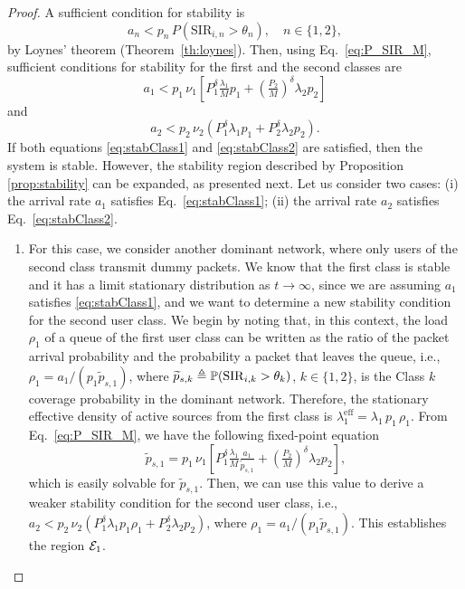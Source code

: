 \begin{proof}
	A sufficient condition for stability is
    \begin{equation}
    a_n < p_n \, P(\mathrm{SIR}_{i,n} > \theta_n), \quad n\in\{1,2\},
    \end{equation}
by Loynes' theorem (Theorem~\ref{th:loynes}). Then, using Eq.~\eqref{eq:P_SIR_M}, sufficient conditions for stability for the first and the second classes are  
    \begin{equation} \label{eq:stabClass1}
    	a_1<p_1\,\nu_1\!\left[P_1^\delta\tfrac{\lambda_1}{M}p_1+\left(\tfrac{P_2}{M}\right)^\delta\lambda_2p_2\right]
    \end{equation}
    and 
    \begin{equation} \label{eq:stabClass2}
	a_2 < p_2\,\nu_2\!\left(P_1^\delta\lambda_1p_1
    	+ P_2^\delta\lambda_2p_2\right).
    \end{equation}
    If both equations \eqref{eq:stabClass1} and \eqref{eq:stabClass2} are satisfied, then the system is stable. However, the stability region described by Proposition \ref{prop:stability} can be expanded, as presented next. Let us consider two cases: (i) the arrival rate $a_1$ satisfies Eq.~\eqref{eq:stabClass1}; (ii) the arrival rate $a_2$ satisfies Eq.~\eqref{eq:stabClass2}.
\begin{enumerate}[label=(\roman*)]
    \item For this case, we consider another dominant network, where only users of the second class transmit dummy packets. We know that the first class is stable and it has a limit stationary distribution as $t\to\infty$, since we are assuming $a_1$ satisfies \eqref{eq:stabClass1}, and we want to determine a new stability condition for the second user class. We begin by noting that, in this context, the load $\rho_1$ of a queue of the first user class can be written as the ratio of the packet arrival probability and the probability a packet that leaves the queue, i.e., $\rho_1 = a_1/(p_1\widetilde{p}_{s,1})$, where $\widetilde{p}_{s,k} \triangleq \P(\mathrm{SIR}_{i,k}>\theta_k)$, $k\in\{1,2\}$, is the Class $k$ coverage probability in the dominant network. Therefore, the stationary  effective density of active sources from the first class is $\lambda_1^\mathrm{eff} = \lambda_1\,p_1\,\rho_1$. From Eq.~\eqref{eq:P_SIR_M}, we have the following fixed-point equation
    \begin{equation*}
    	\widetilde{p}_{s,1}
        	= p_1\,\nu_1\!\left[ P_1^\delta\tfrac{\lambda_1}{M}\tfrac{a_1}{\widetilde{p}_{s,1}}
            	+ \left(\tfrac{P_2}{M}\right)^\delta\!\lambda_2 p_2 \right],
    \end{equation*}
    which is easily solvable for $\widetilde{p}_{s,1}$. Then, we can use this value to derive a weaker stability condition for the second user class, i.e., $a_2<p_2\,\nu_2(P_1^\delta\lambda_1 p_1\rho_1+P_2^\delta\lambda_2 p_2)$, where $\rho_1 = a_1/(p_1\widetilde{p}_{s,1})$. This establishes the region $\cal{E}_1$.
    

\end{enumerate}
\end{proof}

